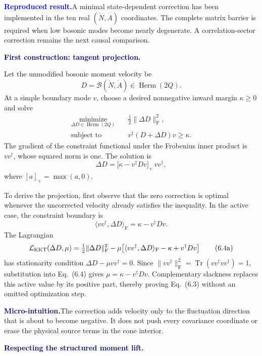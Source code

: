\documentclass[10pt]{article}
\newcommand{\Tr}{\operatorname{Tr}}
\newcommand{\Herm}{\operatorname{Herm}}
\newcommand{\LB}{\mathcal B}
\newcommand{\Frob}{\mathrm F}
\newcommand{\pedbox}[2]{%
  \par\medskip
  \noindent\colorbox{pale}{%
    \parbox{\dimexpr\linewidth-2\fboxsep\relax}{%
      \textcolor{navy}{\textbf{#1}}\quad #2%
    }%
  }\par\medskip
}
\newcommand{\intuition}[1]{\pedbox{Micro-intuition.}{#1}}
\newcommand{\evidencebox}[1]{%
  \par\medskip
  \noindent\colorbox{paleblue}{%
    \parbox{\dimexpr\linewidth-2\fboxsep\relax}{%
      \textcolor{blue}{\textbf{Reproduced result.}}\quad #1%
    }%
  }\par\medskip
}
\newcommand{\flowlead}[1]{%
  \par\medskip
  \needspace{3\baselineskip}%
  \noindent\textcolor{navy}{\textbf{#1.}}\enspace\ignorespaces
}
\begin{document}
\evidencebox{A minimal state-dependent correction has been implemented in the
ten real \((\dot N,\dot A)\) coordinates.  The complete matrix barrier is
required when low bosonic modes become nearly degenerate.  A
correlation-sector correction remains the next causal comparison.}

\flowlead{First construction: tangent projection}

Let the unmodified bosonic moment velocity be
\[
D=\LB(\dot N,\dot A)\in\Herm(2Q).
\tag{6.1}
\]
At a simple boundary mode \(v\), choose a desired nonnegative inward margin
\(\kappa\geq0\) and solve
\[
\begin{aligned}
\underset{\Delta D\in\Herm(2Q)}{\text{minimize}}\quad&
\frac12\lVert\Delta D\rVert_{\Frob}^2,\\
\text{subject to}\quad&
v^\dagger(D+\Delta D)v\geq\kappa.
\end{aligned}
\tag{6.2}
\]
The gradient of the constraint functional under the Frobenius inner product
is \(vv^\dagger\), whose squared norm is one.  The solution is
\[
\boxed{
\Delta D
=\bigl[\kappa-v^\dagger Dv\bigr]_+\,vv^\dagger,
}
\tag{6.3}
\]
where \([a]_+=\max(a,0)\).

To derive the projection, first observe that the zero correction is optimal
whenever the uncorrected velocity already satisfies the inequality.  In the
active case, the constraint boundary is
\[
\langle vv^\dagger,\Delta D\rangle_{\Frob}
=\kappa-v^\dagger Dv.
\tag{6.4}
\]
The Lagrangian
\[
\mathcal L_{\rm KKT}(\Delta D,\mu)
=\tfrac12\lVert\Delta D\rVert_{\Frob}^2
-\mu\!\left[
\langle vv^\dagger,\Delta D\rangle_{\Frob}
-\kappa+v^\dagger Dv\right]
\tag{6.4a}
\]
has stationarity condition
\(\Delta D-\mu vv^\dagger=0\).  Since
\(\lVert vv^\dagger\rVert_{\Frob}^2
=\Tr(vv^\dagger vv^\dagger)=1\), substitution into Eq.~(6.4) gives
\(\mu=\kappa-v^\dagger Dv\).  Complementary slackness replaces this active
value by its positive part, thereby proving Eq.~(6.3) without an omitted
optimization step.

\intuition{The correction adds velocity only to the fluctuation direction
that is about to become negative.  It does not push every covariance
coordinate or erase the physical source terms in the cone interior.}

\flowlead{Respecting the structured moment lift}
\end{document}
